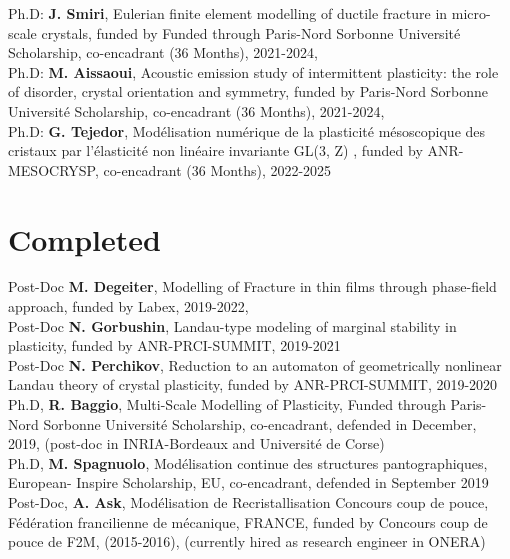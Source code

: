 \documentclass[paper=a4,fontsize=11pt]{temp} %
\begin{document}
Ph.D: \textbf{J. Smiri},  Eulerian finite element modelling of ductile fracture in micro-scale crystals,
funded by Funded through Paris-Nord Sorbonne Université Scholarship, co-encadrant (36 Months), 2021-2024,\\

Ph.D: \textbf{M. Aissaoui},  Acoustic emission study of intermittent plasticity: the role of disorder, crystal orientation and symmetry,
funded by  Paris-Nord Sorbonne Université Scholarship, co-encadrant (36 Months), 2021-2024,\\

Ph.D: \textbf{G. Tejedor},  Modélisation numérique de la plasticité mésoscopique des cristaux par l'élasticité non linéaire invariante GL(3, Z) 
, funded by  ANR-MESOCRYSP, co-encadrant (36 Months), 2022-2025

\section*{Completed}\hspace{1mm}
Post-Doc \textbf{M. Degeiter},  Modelling of Fracture in thin films through phase-field approach,
funded by Labex, 2019-2022,\\

Post-Doc \textbf{N. Gorbushin},  Landau-type modeling of marginal stability in plasticity, funded by ANR-PRCI-SUMMIT, 2019-2021 \\

Post-Doc \textbf{N. Perchikov},  Reduction to an automaton of geometrically nonlinear Landau theory of crystal plasticity, funded by ANR-PRCI-SUMMIT, 2019-2020 \\


Ph.D, \textbf{R. Baggio}, Multi-Scale Modelling of Plasticity,
 Funded through Paris-Nord Sorbonne Université Scholarship, co-encadrant,  defended in  December, 2019, (post-doc in INRIA-Bordeaux and Université de Corse)\\

Ph.D, \textbf{M. Spagnuolo}, Modélisation continue des structures pantographiques, 
European- Inspire Scholarship, EU, co-encadrant,  defended in September 2019\\

Post-Doc, \textbf {A. Ask}, Modélisation de Recristallisation
Concours coup de pouce, Fédération francilienne de mécanique, FRANCE, funded by Concours coup de pouce de F2M, (2015-2016), (currently hired as research engineer in ONERA) \\
\end{document}
